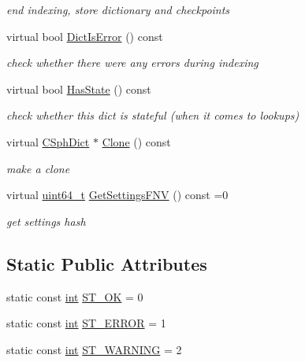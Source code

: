\begin{DoxyCompactItemize}
\begin{DoxyCompactList}\small\item\em end indexing, store dictionary and checkpoints \end{DoxyCompactList}\item 
virtual bool \hyperlink{classCSphDict_a1ee34dbab570265eff0c018f0e120e7b}{Dict\-Is\-Error} () const 
\begin{DoxyCompactList}\small\item\em check whether there were any errors during indexing \end{DoxyCompactList}\item 
virtual bool \hyperlink{classCSphDict_a9fbcd5d7fe55a3a00183e21422344a35}{Has\-State} () const 
\begin{DoxyCompactList}\small\item\em check whether this dict is stateful (when it comes to lookups) \end{DoxyCompactList}\item 
virtual \hyperlink{classCSphDict}{C\-Sph\-Dict} $\ast$ \hyperlink{classCSphDict_a6a62ee7e43eee213e864cba69d6b266c}{Clone} () const 
\begin{DoxyCompactList}\small\item\em make a clone \end{DoxyCompactList}\item 
virtual \hyperlink{sphinxstd_8h_aaa5d1cd013383c889537491c3cfd9aad}{uint64\-\_\-t} \hyperlink{classCSphDict_ac91671a22afcbbb028f37bd100e006b0}{Get\-Settings\-F\-N\-V} () const =0
\begin{DoxyCompactList}\small\item\em get settings hash \end{DoxyCompactList}\end{DoxyCompactItemize}
\subsection*{Static Public Attributes}
\begin{DoxyCompactItemize}
\item 
static const \hyperlink{sphinxexpr_8cpp_a4a26e8f9cb8b736e0c4cbf4d16de985e}{int} \hyperlink{classCSphDict_ab5cf35eecf21bb5b01c449c8d6a6e334}{S\-T\-\_\-\-O\-K} = 0
\item 
static const \hyperlink{sphinxexpr_8cpp_a4a26e8f9cb8b736e0c4cbf4d16de985e}{int} \hyperlink{classCSphDict_abdab06fefa18a50d30e06d19f995c7c5}{S\-T\-\_\-\-E\-R\-R\-O\-R} = 1
\item 
static const \hyperlink{sphinxexpr_8cpp_a4a26e8f9cb8b736e0c4cbf4d16de985e}{int} \hyperlink{classCSphDict_ae9298ace35a55c894fb5b0ff8bbc9d07}{S\-T\-\_\-\-W\-A\-R\-N\-I\-N\-G} = 2
\end{DoxyCompactItemize}
